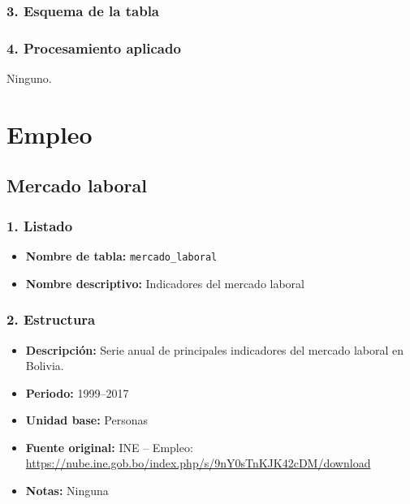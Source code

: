 \documentclass[12pt,a4paper]{article}
\begin{document}
\subsubsection*{3. Esquema de la tabla}

\subsubsection*{4. Procesamiento aplicado}
Ninguno.





\section{Empleo}
\subsection{Mercado laboral}

\subsubsection*{1. Listado}
\begin{itemize}
  \item \textbf{Nombre de tabla:} \texttt{mercado\_laboral}
  \item \textbf{Nombre descriptivo:} Indicadores del mercado laboral
\end{itemize}

\subsubsection*{2. Estructura}
\begin{itemize}
  \item \textbf{Descripción:} Serie anual de principales indicadores del mercado laboral en Bolivia.
  \item \textbf{Periodo:} 1999–2017
  \item \textbf{Unidad base:} Personas
  \item \textbf{Fuente original:}  
    INE – Empleo:\\  
    \url{https://nube.ine.gob.bo/index.php/s/9nY0sTnKJK42cDM/download}
  \item \textbf{Notas:} Ninguna
\end{itemize}
\end{document}
